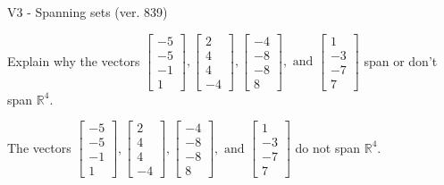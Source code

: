 \begin{exercise}
  \begin{exerciseTitle}V3 - Spanning sets (ver. 839)\end{exerciseTitle}
  \begin{exerciseStatement}
    Explain why the vectors \(\left[\begin{array}{r}
-5 \\
-5 \\
-1 \\
1
\end{array}\right] , \left[\begin{array}{r}
2 \\
4 \\
4 \\
-4
\end{array}\right] , \left[\begin{array}{r}
-4 \\
-8 \\
-8 \\
8
\end{array}\right] , \text{ and } \left[\begin{array}{r}
1 \\
-3 \\
-7 \\
7
\end{array}\right]\) span or don't span \(\mathbb{R}^4\). 
	


  \end{exerciseStatement}
  \begin{exerciseAnswer}
   The vectors \(\left[\begin{array}{r}
-5 \\
-5 \\
-1 \\
1
\end{array}\right] , \left[\begin{array}{r}
2 \\
4 \\
4 \\
-4
\end{array}\right] , \left[\begin{array}{r}
-4 \\
-8 \\
-8 \\
8
\end{array}\right] , \text{ and } \left[\begin{array}{r}
1 \\
-3 \\
-7 \\
7
\end{array}\right]\) 
  	 do not  
	span \(\mathbb{R}^4\).
  


  \end{exerciseAnswer}
\end{exercise}